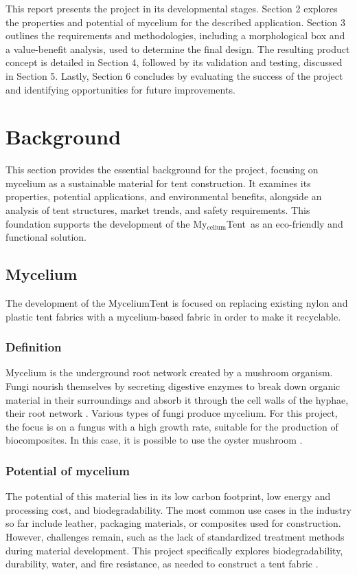 \documentclass{article}
\newcommand{\myc}{My$_{\text{celium}}$Tent}
\begin{document}
This report presents the project in its developmental stages. Section 2 explores the
properties and potential of mycelium for the described application. Section 3 outlines the
requirements and methodologies, including a morphological box and a value-benefit
analysis, used to determine the final design. The resulting product concept is detailed in
Section 4, followed by its validation and testing, discussed in Section 5. Lastly,
Section 6 concludes by evaluating the success of the project and identifying opportunities
for future improvements.


\newpage
\section{Background}
This section provides the essential background for the project, focusing on mycelium as a
sustainable material for tent construction. It examines its properties, potential
applications, and environmental benefits, alongside an analysis of tent structures, market
trends, and safety requirements. This foundation supports the development of the \myc\ as
an eco-friendly and functional solution.

\subsection{Mycelium}
The development of the MyceliumTent is focused on replacing existing nylon and plastic
tent fabrics with a mycelium-based fabric in order to make it recyclable.

\subsubsection{Definition}
Mycelium is the underground root network created by a mushroom organism. Fungi
nourish themselves by secreting digestive enzymes to break down organic material in
their surroundings and absorb it through the cell walls of the hyphae, their root network
\parencite{fungus}. Various types of fungi produce mycelium. For this project, the focus
is on a fungus with a high growth rate, suitable for the production of biocomposites. In
this case, it is possible to use the oyster mushroom \parencite{mushroom}.

\subsubsection{Potential of mycelium}
The potential of this material lies in its low carbon footprint, low energy and processing
cost, and biodegradability. The most common use
cases in the industry so far include leather, packaging materials, or composites used for
construction. However, challenges remain, such as the lack of standardized treatment
methods during material development. This project specifically explores
biodegradability, durability, water, and fire resistance, as needed to construct a tent
fabric \parencite{ALANEME2023234}.
\end{document}
